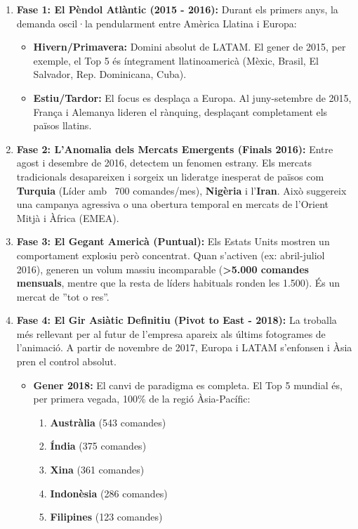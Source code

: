 \documentclass[12pt,a4paper]{article}
\begin{document}
\begin{enumerate}
    \item \textbf{Fase 1: El Pèndol Atlàntic (2015 - 2016):}
    Durant els primers anys, la demanda oscil·la pendularment entre Amèrica Llatina i Europa:
    \begin{itemize}
        \item \textbf{Hivern/Primavera:} Domini absolut de LATAM. El gener de 2015, per exemple, el Top 5 és íntegrament llatinoamericà (Mèxic, Brasil, El Salvador, Rep. Dominicana, Cuba).
        \item \textbf{Estiu/Tardor:} El focus es desplaça a Europa. Al juny-setembre de 2015, França i Alemanya lideren el rànquing, desplaçant completament els països llatins.
    \end{itemize}

    \item \textbf{Fase 2: L'Anomalia dels Mercats Emergents (Finals 2016):}
    Entre agost i desembre de 2016, detectem un fenomen estrany. Els mercats tradicionals desapareixen i sorgeix un lideratge inesperat de països com \textbf{Turquia} (Líder amb ~700 comandes/mes), \textbf{Nigèria} i l'\textbf{Iran}. Això suggereix una campanya agressiva o una obertura temporal en mercats de l'Orient Mitjà i Àfrica (EMEA).

    \item \textbf{Fase 3: El Gegant Americà (Puntual):}
    Els Estats Units mostren un comportament explosiu però concentrat. Quan s'activen (ex: abril-juliol 2016), generen un volum massiu incomparable (\textbf{>5.000 comandes mensuals}, mentre que la resta de líders habituals ronden les 1.500). És un mercat de ''tot o res''.

    \item \textbf{Fase 4: El Gir Asiàtic Definitiu (Pivot to East - 2018):}
    La troballa més rellevant per al futur de l'empresa apareix als últims fotogrames de l'animació. A partir de novembre de 2017, Europa i LATAM s'enfonsen i Àsia pren el control absolut.
    \begin{itemize}
        \item \textbf{Gener 2018:} El canvi de paradigma es completa. El Top 5 mundial és, per primera vegada, 100\% de la regió Àsia-Pacífic:
        \begin{enumerate}
            \item \textbf{Austràlia} (543 comandes)
            \item \textbf{Índia} (375 comandes)
            \item \textbf{Xina} (361 comandes)
            \item \textbf{Indonèsia} (286 comandes)
            \item \textbf{Filipines} (123 comandes)
        \end{enumerate}
    \end{itemize}
\end{enumerate}
\end{document}
